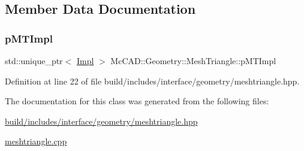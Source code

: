 \subsection{Member Data Documentation}
\mbox{\label{classMcCAD_1_1Geometry_1_1MeshTriangle_a1e7fcfc7c77cdeae2d25a8a989a53d09}} 
\subsubsection{\texorpdfstring{p\+M\+T\+Impl}{pMTImpl}}
{\footnotesize\ttfamily std\+::unique\+\_\+ptr$<$ \hyperlink{classMcCAD_1_1Geometry_1_1MeshTriangle_1_1Impl}{Impl} $>$ Mc\+C\+A\+D\+::\+Geometry\+::\+Mesh\+Triangle\+::p\+M\+T\+Impl\hspace{0.3cm}{\ttfamily [private]}}



Definition at line 22 of file build/includes/interface/geometry/meshtriangle.\+hpp.



The documentation for this class was generated from the following files\+:\begin{DoxyCompactItemize}
\item 
\hyperlink{build_2includes_2interface_2geometry_2meshtriangle_8hpp}{build/includes/interface/geometry/meshtriangle.\+hpp}\item 
\hyperlink{meshtriangle_8cpp}{meshtriangle.\+cpp}\end{DoxyCompactItemize}
